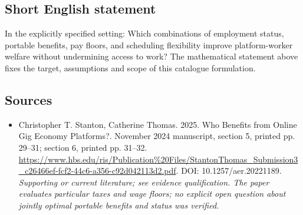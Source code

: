 \documentclass[11pt]{article}
\begin{document}
\subsection{Short English statement}
In the explicitly specified setting: Which combinations of employment status, portable benefits, pay floors, and scheduling flexibility improve platform-worker welfare without undermining access to work? The mathematical statement above fixes the target, assumptions and scope of this catalogue formulation.

\subsection{Sources}
\begin{itemize}\raggedright
\item[\textnormal{[S1]}]\hypertarget{source:30007639:1}{} Christopher T. Stanton, Catherine Thomas. 2025. Who Benefits from Online Gig Economy Platforms?. November 2024 manuscript, section 5, printed pp. 29–31; section 6, printed pp. 31–32.
\url{https://www.hbs.edu/ris/Publication%20Files/StantonThomas_Submission3_c26466ef-fcf2-44c6-a356-c92d042113d2.pdf}.
DOI: 10.1257/aer.20221189.
{\small\textit{Supporting or current literature; see evidence qualification. The paper evaluates particular taxes and wage floors; no explicit open question about jointly optimal portable benefits and status was verified.}}
\end{itemize}
\end{document}
